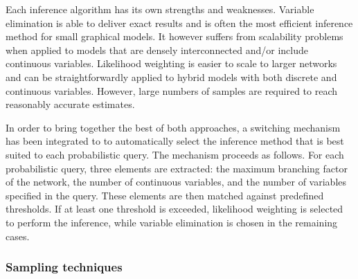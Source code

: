 Each inference algorithm has its own strengths and weaknesses. Variable elimination is able to deliver exact results and is often the most efficient inference method for small graphical models.  It however suffers from scalability problems when applied to models that are densely interconnected and/or include continuous variables. Likelihood weighting is easier to scale to larger networks and can be straightforwardly applied to hybrid models with both discrete and continuous variables. However, large numbers of samples are required to reach reasonably accurate estimates.

In order to bring together the best of both approaches, a switching mechanism has been integrated to \opendial{} to automatically select the inference method that is best suited to each probabilistic query.  The mechanism proceeds as follows. For each probabilistic query, three elements are extracted: the maximum branching factor of the network, the number of continuous variables, and the number of variables specified in the query. These elements are then matched against predefined thresholds. If at least one threshold is exceeded, likelihood weighting is selected to perform the inference, while variable elimination is chosen in the remaining cases. 

\subsubsection*{Sampling techniques}

